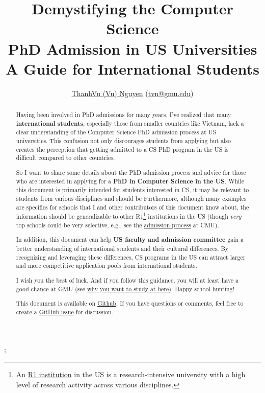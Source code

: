 \documentclass[11pt]{article}
\title{\vspace{-1in} Demystifying the Computer Science \\PhD Admission in US Universities\\{\large A Guide for International Students}}
\author{\small \href{https://nguyenthanhvuh.github.io}{ThanhVu (Vu) Nguyen} (\href{mailto:tvn@gmu.edu}{tvn@gmu.edu})}
\begin{document}
\maketitle
\setcounter{section}{-1};

\begin{abstract}
    Having been involved in PhD admissions for many years, I've
    realized that many \textbf{international students}, especially those from smaller countries like Vietnam, lack a clear understanding of
    the Computer Science PhD admission process at US universities. This confusion not only
    discourages students from applying but also creates the perception that
    getting admitted to a CS PhD program in the US is difficult compared to other countries.
    
    So I want to share some details about the PhD admission process and advice for those who are interested in applying for a \textbf{PhD in Computer Science in the US}.
    While this document is primarily intended for students interested in CS, it may be relevant to students from various disciplines and should be 
    Furthermore, although many examples are specifics for schools that I and other contributors of this document know about, the information should be generalizable to other R1\footnote{An \href{https://en.wikipedia.org/wiki/List_of_research_universities_in_the_United_States}{R1 institution} in the US is a research-intensive university with a high level of research activity across various disciplines.} institutions in the US  (though \emph{very} top schools could be very selective, e.g., see the \href{https://da-data.blogspot.com/2015/03/reflecting-on-cs-graduate-admissions.html}{admission process} at CMU).
    
    In addition, this document can help \textbf{US faculty and admission committee} gain a better understanding of international students and their cultural differences.  By recognizing and leveraging these differences, CS programs in the US can attract larger and more competitive application pools from international students.
    
    I wish you the best of luck. And if you follow this guidance, you will at least have a good chance at GMU (see
    \href{https://github.com/dynaroars/dynaroars.github.io/wiki/About-GMU}{why
    you want to study at here}). Happy school hunting!
    
    This document is available on \href{https://github.com/nguyenthanhvuh/phd-cs-us}{Github}. If you have questions or comments, feel free to create a \href{https://github.com/nguyenthanhvuh/phd-cs-us/issues}{GitHub issue} for discussion.
\end{abstract}
\end{document}
